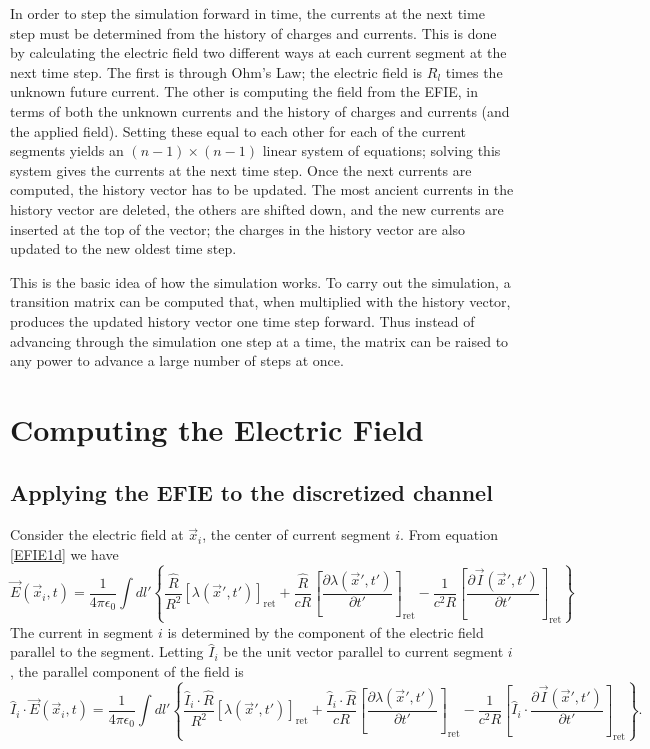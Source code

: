 \documentclass{article}
\begin{document}
In order to step the simulation forward in time, the currents at the next time step must be determined from the history of charges and currents. This is done by calculating the electric field two different ways at each current segment at the next time step. The first is through Ohm's Law; the electric field is $R_l$ times the unknown future current. The other is computing the field from the EFIE, in terms of both the unknown currents and the history of charges and currents (and the applied field). Setting these equal to each other for each of the current segments yields an $(n-1)\times(n-1)$ linear system of equations; solving this system gives the currents at the next time step. Once the next currents are computed, the history vector has to be updated. The most ancient currents in the history vector are deleted, the others are shifted down, and the new currents are inserted at the top of the vector; the charges in the history vector are also updated to the new oldest time step.

This is the basic idea of how the simulation works. To carry out the simulation, a transition matrix can be computed that, when multiplied with the history vector, produces the updated history vector one time step forward. Thus instead of advancing through the simulation one step at a time, the matrix can be raised to any power to advance a large number of steps at once.

\section{Computing the Electric Field}
\subsection{Applying the EFIE to the discretized channel}
Consider the electric field at $\vec{x}_i$, the center of current segment $i$. From equation \ref{EFIE1d} we have
\begin{equation}
\vec{E}(\vec{x}_i, t) = \frac{1}{4\pi\epsilon_0} \int dl' \left\{ \frac{\hat{R}}{R^2} \left[\lambda(\vec{x}', t')\right]_\text{ret} + \frac{\hat{R}}{cR} \left[\frac{\partial\lambda(\vec{x}', t')}{\partial t'}\right]_\text{ret} - \frac{1}{c^2R} \left[\frac{\partial\vec{I}(\vec{x}', t')}{\partial t'}\right]_\text{ret}\right\}
\end{equation}
The current in segment $i$ is determined by the component of the electric field parallel to the segment. Letting $\hat{I}_i$ be the unit vector parallel to current segment $i$, the parallel component of the field is
\begin{equation}
\hat{I}_i\cdot\vec{E}(\vec{x}_i, t) = \frac{1}{4\pi\epsilon_0} \int dl' \left\{ \frac{\hat{I}_i\cdot\hat{R}}{R^2} \left[\lambda(\vec{x}', t')\right]_\text{ret} + \frac{\hat{I}_i\cdot\hat{R}}{cR} \left[\frac{\partial\lambda(\vec{x}', t')}{\partial t'}\right]_\text{ret} - \frac{1}{c^2R} \left[\hat{I}_i\cdot\frac{\partial\vec{I}(\vec{x}', t')}{\partial t'}\right]_\text{ret}\right\}.
\end{equation}
\end{document}
